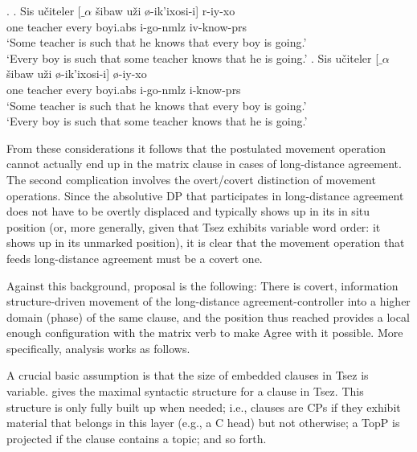 \documentclass[output=paper
,modfonts
,nonflat]{langsci/langscibook}
\begin{document}
\Lsciex.   \label{scope32}
\ag. Sis u\v{c}iteler [$\_${$\alpha$} \v{s}ibaw u\v{z}i \o -ik'ixosi-\textbeltl i] r-iy-xo \\
     one teacher {} every boy{\sc i}.{\sc abs} {\sc i}-go-{\sc nmlz} {\sc iv}-know-{\sc prs}  \\
     `Some teacher is such that he knows that every boy is going.'\\
     `Every boy is such that some teacher knows that he is going.'
\bg. Sis u\v{c}iteler [$\_${$\alpha$} \v{s}ibaw u\v{z}i \o -ik'ixosi-\textbeltl i] \o -iy-xo \\
     one teacher {} every boy{\sc i}.{\sc abs} {\sc i}-go-{\sc nmlz} {\sc i}-know-{\sc prs}  \\
      `Some teacher is such that he knows that every boy is going.'\\
      `Every boy is such that some teacher knows that he is going.'

From
these considerations it follows that the postulated movement operation
cannot actually end up in the matrix clause in cases of long-distance
agreement. The second complication involves the overt/covert
distinction of movement operations. Since the absolutive DP that participates in
  long-distance agreement does not have to be overtly
  displaced and typically shows up in its in situ position (or, more generally, given
  that Tsez exhibits variable word order: it shows up in its unmarked position),
  it is clear that the movement operation that feeds long-distance
  agreement must be a covert one. 

Against this background,  proposal is
the following: There is  covert, information structure-driven
  movement of the long-distance agreement-controller into a higher domain (phase) of the
  same clause, and the position thus reached provides a  local enough
  configuration with the matrix verb to make  Agree with it possible.
More specifically,  analysis works as
follows. 

A crucial basic assumption is that the size of embedded clauses in
Tsez is variable. \Next gives the maximal syntactic structure for a
clause in Tsez. This structure is only fully  built up when needed;
i.e., clauses are CPs if they exhibit material that belongs in this
layer (e.g., a C head) but not otherwise; a TopP is projected if the
clause contains a topic; and so forth. 
\end{document}
